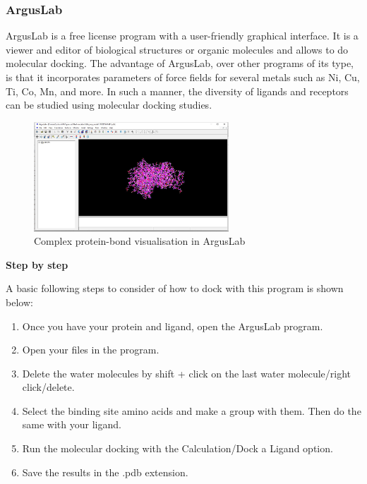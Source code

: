 \documentclass[11pt, letterpaper, english]{article}
\begin{document}
\subsubsection{ArgusLab}
        \par ArgusLab is a free license program with a user-friendly graphical interface. It is a viewer and editor of biological structures or organic molecules and allows to do molecular docking. The advantage of ArgusLab, over other programs of its type, is that it incorporates parameters of force fields for several metals such as Ni, Cu, Ti, Co, Mn, and more. In such a manner, the diversity of ligands and receptors can be studied using molecular docking studies.
        
\begin{figure}
	    \centering
		\caption{Complex protein-bond visualisation in ArgusLab  \cite{Thompson_2004}}
		\includegraphics[width=0.65\textwidth]{argus}
	\end{figure}     
	\par{\textbf{Step by step}}
        \par{A basic following steps to consider of how to dock with this program is shown below:}
            \begin{enumerate}[1.]
            \item Once you have your protein and ligand, open the ArgusLab program.
            \item Open your files in the program.
            \item Delete the water molecules by shift + click on the last water molecule/right click/delete.
            \item Select the binding site amino acids and make a group with them. Then do the same with your ligand.
            \item Run the molecular docking with the Calculation/Dock a Ligand option.
            \item Save the results in the .pdb extension.
            \end{enumerate}
\end{document}
